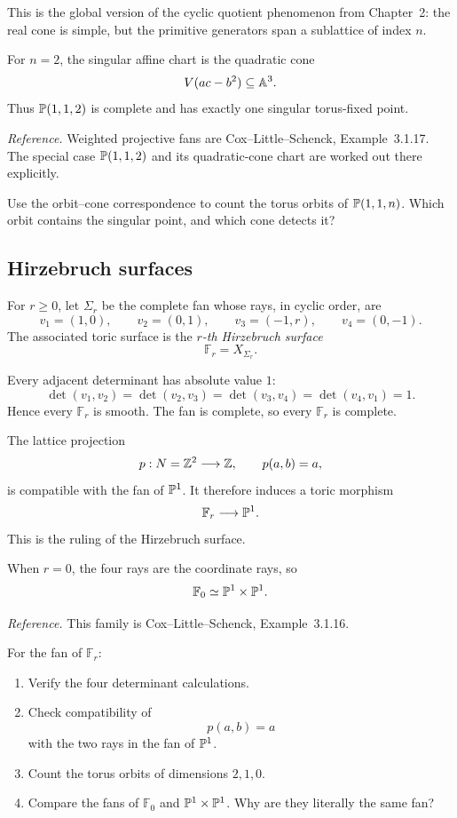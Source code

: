 This is the global version of the cyclic quotient phenomenon from
Chapter~2: the real cone is simple, but the primitive generators span
a sublattice of index \(n\).

\begin{example}
For \(n=2\), the singular affine chart is the quadratic cone
\[
V(ac-b^2)\subseteq\mathbb{A}^3.
\]
Thus \(\mathbb{P}(1,1,2)\) is complete and has exactly one singular
torus-fixed point.
\end{example}

\noindent
\textit{Reference.}
Weighted projective fans are Cox--Little--Schenck,
Example~3.1.17. The special case \(\mathbb{P}(1,1,2)\) and its quadratic-cone
chart are worked out there explicitly.

\begin{pauseandthink}
Use the orbit--cone correspondence to count the torus orbits of
\(\mathbb{P}(1,1,n)\). Which orbit contains the singular point, and which
cone detects it?
\end{pauseandthink}

\subsection{Hirzebruch surfaces}

For \(r\geq0\), let \(\Sigma_r\) be the complete fan whose rays, in
cyclic order, are
\[
v_1=(1,0),
\qquad
v_2=(0,1),
\qquad
v_3=(-1,r),
\qquad
v_4=(0,-1).
\]
The associated toric surface is the \emph{\(r\)-th Hirzebruch
surface}
\[
\mathbb F_r=X_{\Sigma_r}.
\]

Every adjacent determinant has absolute value \(1\):
\[
\det(v_1,v_2)
=
\det(v_2,v_3)
=
\det(v_3,v_4)
=
\det(v_4,v_1)
=
1.
\]
Hence every \(\mathbb F_r\) is smooth. The fan is complete, so every
\(\mathbb F_r\) is complete.

The lattice projection
\[
p:N=\mathbb{Z}^2\longrightarrow\mathbb{Z},
\qquad
p(a,b)=a,
\]
is compatible with the fan of \(\mathbb{P}^1\). It therefore induces a toric
morphism
\[
\mathbb F_r\longrightarrow\mathbb{P}^1.
\]
This is the ruling of the Hirzebruch surface.

When \(r=0\), the four rays are the coordinate rays, so
\[
\mathbb F_0\simeq\mathbb{P}^1\times\mathbb{P}^1.
\]

\noindent
\textit{Reference.}
This family is Cox--Little--Schenck, Example~3.1.16.

\begin{surfacelaboratory}
For the fan of \(\mathbb F_r\):

\begin{enumerate}[label=(\alph*),wide=0pt]
\item Verify the four determinant calculations.

\item Check compatibility of
\[
p(a,b)=a
\]
with the two rays in the fan of \(\mathbb{P}^1\).

\item Count the torus orbits of dimensions \(2,1,0\).

\item Compare the fans of \(\mathbb F_0\) and
\(\mathbb{P}^1\times\mathbb{P}^1\). Why are they literally the same fan?
\end{enumerate}
\end{surfacelaboratory}

